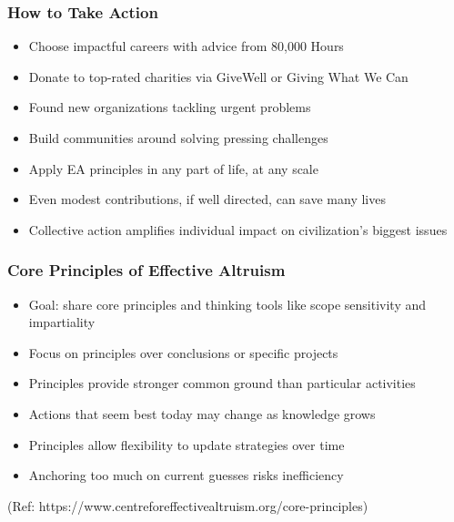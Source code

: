\begin{frame}[fragile]\frametitle{How to Take Action}
      \begin{itemize}
        \item Choose impactful careers with advice from 80,000 Hours
        \item Donate to top-rated charities via GiveWell or Giving What We Can
        \item Found new organizations tackling urgent problems
        \item Build communities around solving pressing challenges
        \item Apply EA principles in any part of life, at any scale
        \item Even modest contributions, if well directed, can save many lives
        \item Collective action amplifies individual impact on civilization’s biggest issues
      \end{itemize}
\end{frame}
\begin{frame}[fragile]\frametitle{Core Principles of Effective Altruism}
      \begin{itemize}
        \item Goal: share core principles and thinking tools like scope sensitivity and impartiality
        \item Focus on principles over conclusions or specific projects
        \item Principles provide stronger common ground than particular activities
        \item Actions that seem best today may change as knowledge grows
        \item Principles allow flexibility to update strategies over time
        \item Anchoring too much on current guesses risks inefficiency
      \end{itemize}
	  
	
{\tiny (Ref: https://www.centreforeffectivealtruism.org/core-principles)}  	  
\end{frame}

